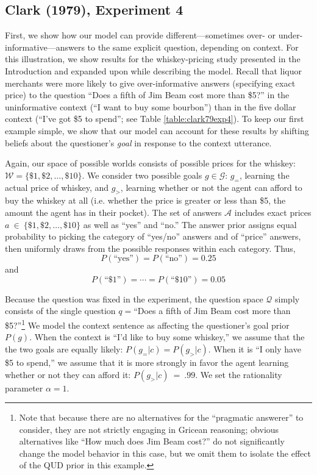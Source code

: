 \documentclass[12pt, floatsintext, jou]{apa6}
\begin{document}
\subsection{Clark (1979), Experiment 4}
First, we show how our model can provide different---sometimes over- or under-informative---answers to the same explicit question, depending on context. For this illustration, we show results for the whiskey-pricing study presented in the Introduction \cite{Clark79_IndirectSpeechActs} and expanded upon while describing the model. Recall that liquor merchants were more likely to give over-informative answers (specifying exact price) to the question ``Does a fifth of Jim Beam cost more than \$5?'' in the uninformative context (``I want to buy some bourbon'') than in the five dollar context (``I've got \$5 to spend''; see Table \ref{table:clark79exp4}). To keep our first example simple, we show that our model can account for these results by shifting beliefs about the questioner's \emph{goal} in response to the context utterance. 

Again, our space of possible worlds consists of possible prices for the whiskey: $\mathcal{W} = \{\$1, \$2, \dots, \$10\}$. We consider two possible goals $g \in \mathcal{G}$: $g_=$, learning the actual price of whiskey,  and $g_>$, learning whether or not the agent can afford to buy the whiskey at all (i.e. whether the price is greater or less than \$5, the amount the agent has in their pocket). The set of answers $\mathcal{A}$ includes exact prices $a~\in~\{\$1, \$2, \dots, \$10\}$ as well as ``yes'' and ``no.'' The answer prior assigns equal probability to picking the category of ``yes/no'' answers and of ``price'' answers, then uniformly draws from the possible responses within each category. Thus, $$P(\textrm{``yes''}) = P(\textrm{``no''}) = 0.25$$ and $$P(\textrm{``\$1''}) = \cdots = P(\textrm{``\$10''}) = 0.05$$

Because the question was fixed in the experiment, the question space $\mathcal{Q}$ simply consists of the single question $q = $``Does a fifth of Jim Beam cost more than \$5?''\footnote{Note that because there are no alternatives for the ``pragmatic answerer'' to consider, they are not strictly engaging in Gricean reasoning; obvious alternatives like ``How much does Jim Beam cost?'' do not significantly change the model behavior in this case, but we omit them to isolate the effect of the QUD prior in this example.}  We model the context sentence as affecting the questioner's goal prior $P(g)$. When the context is ``I'd like to buy some whiskey,'' we assume that the the two goals are equally likely: $P(g_= | c) = P(g_> | c)$. When it is ``I only have \$5 to spend,'' we assume that it is more strongly in favor the agent learning whether or not they can afford it: $P(g_> | c)~=~.99$. We set the rationality parameter $\alpha = 1$.
\end{document}

